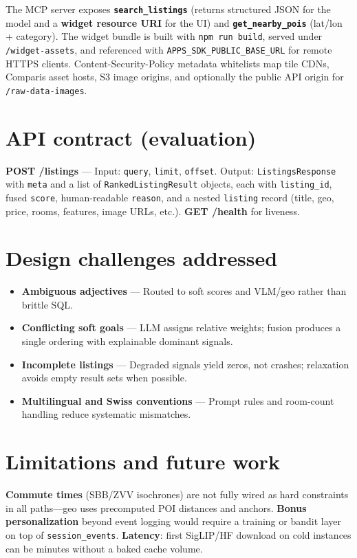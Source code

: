 \documentclass[11pt]{article}
\begin{document}
The MCP server exposes \textbf{\texttt{search\_listings}} (returns structured JSON for the model and a \textbf{widget resource URI} for the UI) and \textbf{\texttt{get\_nearby\_pois}} (lat/lon + category). The widget bundle is built with \texttt{npm run build}, served under \texttt{/widget-assets}, and referenced with \texttt{APPS\_SDK\_PUBLIC\_BASE\_URL} for remote HTTPS clients. Content-Security-Policy metadata whitelists map tile CDNs, Comparis asset hosts, S3 image origins, and optionally the public API origin for \texttt{/raw-data-images}.

\section{API contract (evaluation)}

\textbf{POST /listings} --- Input: \texttt{query}, \texttt{limit}, \texttt{offset}. Output: \texttt{ListingsResponse} with \texttt{meta} and a list of \texttt{RankedListingResult} objects, each with \texttt{listing\_id}, fused \texttt{score}, human-readable \texttt{reason}, and a nested \texttt{listing} record (title, geo, price, rooms, features, image URLs, etc.). \textbf{GET /health} for liveness.

\section{Design challenges addressed}

\begin{itemize}[noitemsep, topsep=2pt]
  \item \textbf{Ambiguous adjectives} --- Routed to soft scores and VLM/geo rather than brittle SQL.
  \item \textbf{Conflicting soft goals} --- LLM assigns relative weights; fusion produces a single ordering with explainable dominant signals.
  \item \textbf{Incomplete listings} --- Degraded signals yield zeros, not crashes; relaxation avoids empty result sets when possible.
  \item \textbf{Multilingual and Swiss conventions} --- Prompt rules and room-count handling reduce systematic mismatches.
\end{itemize}

\section{Limitations and future work}

\textbf{Commute times} (SBB/ZVV isochrones) are not fully wired as hard constraints in all paths---geo uses precomputed POI distances and anchors. \textbf{Bonus personalization} beyond event logging would require a training or bandit layer on top of \texttt{session\_events}. \textbf{Latency}: first SigLIP/HF download on cold instances can be minutes without a baked cache volume.
\end{document}
